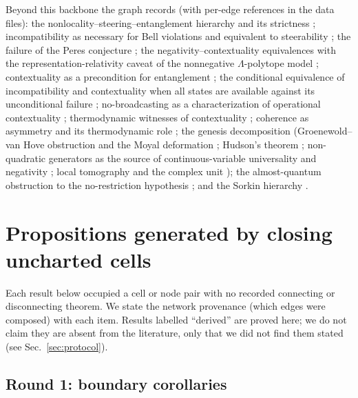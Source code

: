 \documentclass[11pt,a4paper]{article}
\theoremstyle{definition}
\begin{document}
Beyond this backbone the graph records (with per-edge references in the data
files): the nonlocality--steering--entanglement hierarchy and its strictness
\cite{wiseman2007,werner1989,barrett2002,gisin1991}; incompatibility as
necessary for Bell violations \cite{fine1982} and equivalent to steerability
\cite{quintino2014,uola2014}; the failure of the Peres conjecture
\cite{vertesi2014}; the negativity--contextuality equivalences
\cite{howard2014,booth2022} with the representation-relativity caveat of the
nonnegative $\Lambda$-polytope model \cite{zurel2020}; contextuality as a
precondition for entanglement \cite{plavala2024}; the conditional equivalence
of incompatibility and contextuality when all states are available
\cite{tavakoli2020} against its unconditional failure \cite{selby2023};
no-broadcasting as a characterization of operational contextuality
\cite{nobroadcast2024}; thermodynamic witnesses of contextuality
\cite{lostaglio2018,perarnau2017,micadei2019}; coherence as asymmetry and its
thermodynamic role \cite{marvian2014,lostaglio2015}; the genesis decomposition
(Groenewold--van Hove obstruction and the Moyal deformation
\cite{groenewold1946,moyal1949,bffls1978,kontsevich2003}; Hudson's theorem
\cite{hudson1974}; non-quadratic generators as the source of continuous-variable
universality and negativity \cite{lloyd1999,takagi2018}; local tomography and
the complex unit \cite{hardywootters2012,renou2021,stueckelberg1960}); the
almost-quantum obstruction to the no-restriction hypothesis
\cite{navascues2015,sainz2018}; and the Sorkin hierarchy
\cite{sorkin1994,sinha2010,dakic2014}.

\section{Propositions generated by closing uncharted cells}\label{sec:generated}

Each result below occupied a cell or node pair with no recorded connecting or
disconnecting theorem. We state the network provenance (which edges were
composed) with each item. Results labelled ``derived'' are proved here; we do
not claim they are absent from the literature, only that we did not find them
stated (see Sec.~\ref{sec:protocol}).

\subsection{Round 1: boundary corollaries}
\end{document}

